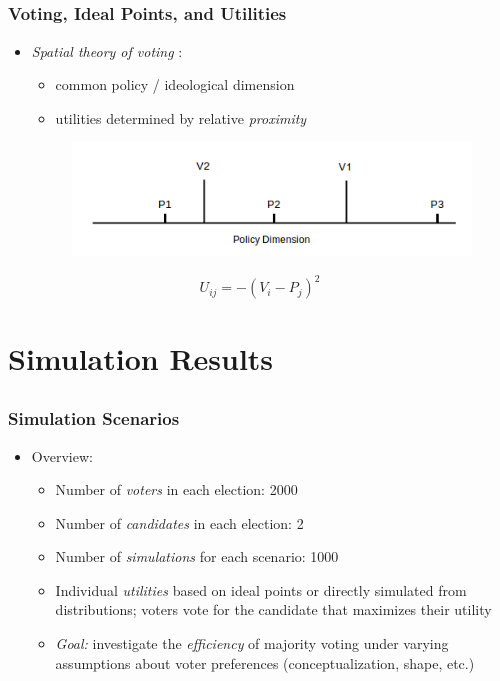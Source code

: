 \documentclass{beamer}
\begin{document}
\subsection{}
\begin{frame}%
\frametitle{Voting, Ideal Points, and Utilities}
\begin{itemize}
  \item \emph{Spatial theory of voting} \citep[e.g.][]{downs1957economic,enelow1984spatial}:
  \begin{itemize}
     \item common policy / ideological dimension
     \item utilities determined by relative \emph{proximity}
   \end{itemize}
  \begin{figure}[b]\centering
      \includegraphics[width=.8\textwidth]{../paper/ideal_plot.png}
  \end{figure}
  \end{itemize}
  $$ U_{ij} = -(V_i - P_j)^2 $$
\end{frame}

\section{Simulation Results}
\subsection{}
\begin{frame}%
  \frametitle{Simulation Scenarios}
  \begin{itemize}
    \item Overview:
    \begin{itemize}
      \item Number of \emph{voters} in each election: 2000
      \item Number of \emph{candidates} in each election: 2
      \item Number of \emph{simulations} for each scenario: 1000
      \item Individual \emph{utilities} based on ideal points or directly simulated from distributions; voters vote for the candidate that maximizes their utility
      \item \emph{Goal:} investigate the \emph{efficiency} of majority voting under varying assumptions about voter preferences (conceptualization, shape, etc.)
    \end{itemize}
  \end{itemize}
\end{frame}
\end{document}
